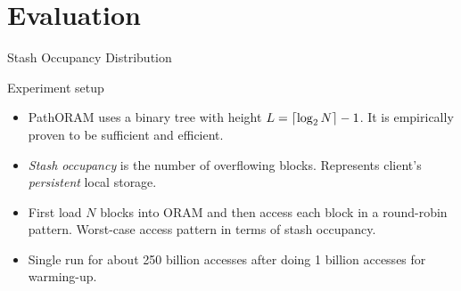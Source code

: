 \section{Evaluation}

	\begin{frame}{Stash Occupancy Distribution}
		
		\begin{block}{Experiment setup}
			
			\begin{itemize}
				\item 
					PathORAM uses a binary tree with height $L = \ceil*{\log_2 N} - 1$.
					It is empirically proven to be sufficient and efficient.
				\item
					\emph{Stash occupancy} is the number of overflowing blocks.
					Represents client's \emph{persistent} local storage.
				\item
					First load $N$ blocks into ORAM and then access each block in a round-robin pattern.
					Worst-case access pattern in terms of stash occupancy.
				\item 
					Single run for about 250 billion accesses after doing 1 billion accesses for warming-up.
			\end{itemize}
			
		\end{block}
			
		
	\end{frame}

